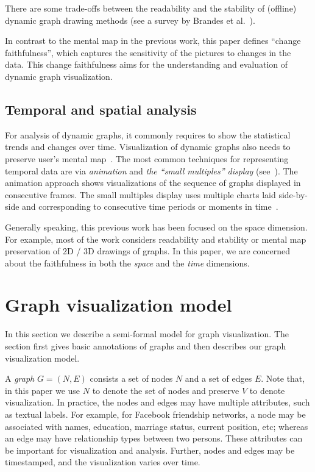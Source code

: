 \documentclass[10pt,journal,cspaper,compsoc]{IEEEtran}
\begin{document}
There are some trade-offs between the readability and the stability of (offline) dynamic graph drawing methods (see a survey by Brandes et al.~\cite{brandes2012quantitative}).

In contrast to the mental map in the previous work, this paper defines ``change faithfulness'', which captures the sensitivity of the pictures to changes in the data. This change faithfulness aims for the understanding and evaluation of dynamic graph visualization.

\subsection{Temporal and spatial analysis}
For analysis of dynamic graphs, it commonly requires to show the statistical trends
and changes over time. Visualization of dynamic graphs also needs to preserve user's mental map~\cite{misue1995layout}.
The most common techniques for representing temporal data are via {\em animation} and {\em the ``small multiples'' display} (see~\cite{archambault2011animation}). The animation approach shows visualizations of the sequence of graphs displayed in consecutive frames. The small multiples display uses multiple charts laid side-by-side and corresponding to consecutive time periods or moments in time~\cite{andrienko2006exploratory}.

Generally speaking, this previous work has been focused on the space dimension. For example,  most of the work considers readability and stability or mental map preservation of 2D / 3D drawings of graphs. In this paper, we are concerned about the faithfulness in both the \emph{space} and the \emph{time} dimensions.


\section{Graph visualization model\label{sec:vizmodel}}

In this section we describe a semi-formal model for
graph visualization. The section first gives basic annotations of graphs and then describes our graph visualization model.

A \emph{graph} $G=(N,E)$ consists a set of nodes $N$ and a set of
edges $E$.  Note that, in this paper we use $N$ to denote the set of nodes and preserve $V$ to denote visualization.
In practice, the nodes and edges may have multiple
attributes, such as textual labels. For example, for Facebook friendship networks, a node may be associated with names, education, marriage status, current position, etc; whereas an edge may have relationship types between two persons. These attributes can be important
for visualization and analysis.
Further, nodes and edges may be timestamped, and the visualization
varies over time.
\end{document}
